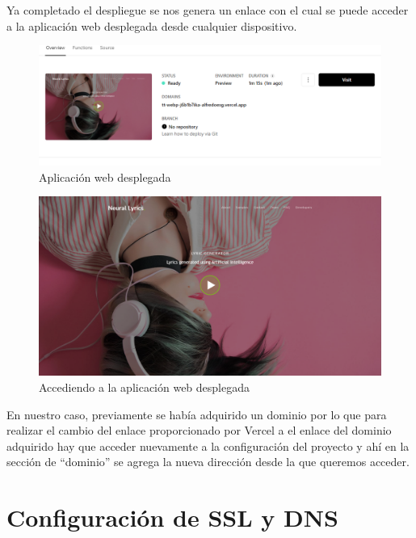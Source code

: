 \documentclass[12pt, a4paper, titlepage]{article}
\begin{document}
	Ya completado el despliegue se nos genera un enlace con el cual se puede acceder a la aplicación web desplegada desde cualquier dispositivo.
	\begin{figure}[H]
		\includegraphics[width=12cm]{./Imagenes/Despliegue/Desplegada.png}
		\centering 
		\caption{Aplicación web desplegada}
	\end{figure}
	\begin{figure}[H]
		\includegraphics[width=12cm]{./Imagenes/Despliegue/Paginaweb.png}
		\centering 
		\caption{Accediendo a la aplicación web desplegada}
	\end{figure}
	En nuestro caso, previamente se había adquirido un dominio por lo que para realizar el cambio del enlace proporcionado por Vercel a el enlace del dominio adquirido hay que acceder nuevamente a la configuración del proyecto y ahí en la sección de “dominio” se agrega la nueva dirección desde la que queremos acceder.
	\newpage
	\section{Configuración de SSL y DNS}
	
\end{document}
